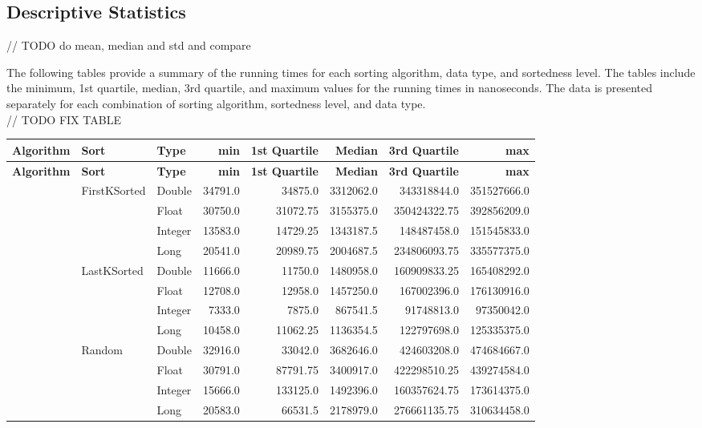 \documentclass[unicode,11pt,a4paper,oneside,numbers=endperiod,openany]{scrartcl}
\begin{document}
    \subsection{Descriptive Statistics}

    // TODO do mean, median and std and compare 
    
    The following tables provide a summary of the running times for each sorting algorithm, data type, and sortedness level. The tables include the minimum, 1st quartile, median, 3rd quartile, and maximum values for the running times in nanoseconds. The data is presented separately for each combination of sorting algorithm, sortedness level, and data type.\\

    // TODO FIX TABLE
    \begin{center}
        \footnotesize
        \begin{longtable}{|l|l|l|r|r|r|r|r|}
            \hline
            \textbf{Algorithm} & \textbf{Sort} & \textbf{Type} & \textbf{min} & \textbf{1st Quartile} & \textbf{Median} & \textbf{3rd Quartile} & \textbf{max} \\
            \hline
            \endfirsthead
            \hline
            \textbf{Algorithm} & \textbf{Sort} & \textbf{Type} & \textbf{min} & \textbf{1st Quartile} & \textbf{Median} & \textbf{3rd Quartile} & \textbf{max} \\
            \hline
            \endhead
            \hline
            \endfoot
    
            \multirow{12}{*}{BSUNC} & \multirow{4}{*}{FirstKSorted} & Double & 34791.0 & 34875.0 & 3312062.0 & 343318844.0 & 351527666.0 \\
            & & Float & 30750.0 & 31072.75 & 3155375.0 & 350424322.75 & 392856209.0 \\
            & & Integer & 13583.0 & 14729.25 & 1343187.5 & 148487458.0 & 151545833.0 \\
            & & Long & 20541.0 & 20989.75 & 2004687.5 & 234806093.75 & 335577375.0 \\
            \cline{2-8}
            & \multirow{4}{*}{LastKSorted} & Double & 11666.0 & 11750.0 & 1480958.0 & 160909833.25 & 165408292.0 \\
            & & Float & 12708.0 & 12958.0 & 1457250.0 & 167002396.0 & 176130916.0 \\
            & & Integer & 7333.0 & 7875.0 & 867541.5 & 91748813.0 & 97350042.0 \\
            & & Long & 10458.0 & 11062.25 & 1136354.5 & 122797698.0 & 125335375.0 \\
            \cline{2-8}
            & \multirow{4}{*}{Random} & Double & 32916.0 & 33042.0 & 3682646.0 & 424603208.0 & 474684667.0 \\
            & & Float & 30791.0 & 87791.75 & 3400917.0 & 422298510.25 & 439274584.0 \\
            & & Integer & 15666.0 & 133125.0 & 1492396.0 & 160357624.75 & 173614375.0 \\
            & & Long & 20583.0 & 66531.5 & 2178979.0 & 276661135.75 & 310634458.0 \\
            \hline
    

\end{longtable}
\end{center}
\end{document}
